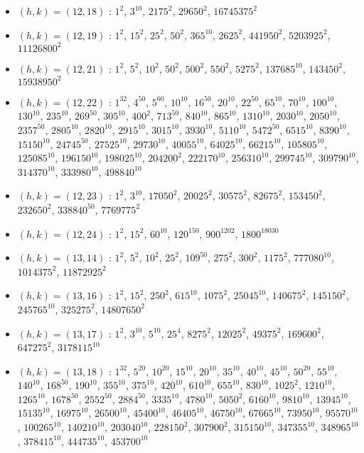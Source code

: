 \begin{itemize}
\item $(h,k)=(12,18)$ : $1^{2}$, $3^{10}$, $2175^{2}$, $29650^{2}$, $16745375^{2}$
\item $(h,k)=(12,19)$ : $1^{2}$, $15^{2}$, $25^{2}$, $50^{2}$, $365^{10}$, $2625^{2}$, $441950^{2}$, $5203925^{2}$, $11126800^{2}$
\item $(h,k)=(12,21)$ : $1^{2}$, $5^{2}$, $10^{2}$, $50^{2}$, $500^{2}$, $550^{2}$, $5275^{2}$, $137685^{10}$, $143450^{2}$, $15938950^{2}$
\item $(h,k)=(12,22)$ : $1^{32}$, $4^{50}$, $5^{60}$, $10^{10}$, $16^{50}$, $20^{10}$, $22^{50}$, $65^{10}$, $70^{10}$, $100^{10}$, $130^{10}$, $235^{10}$, $269^{50}$, $305^{10}$, $400^{2}$, $713^{50}$, $840^{10}$, $865^{10}$, $1310^{10}$, $2030^{10}$, $2050^{10}$, $2357^{50}$, $2805^{10}$, $2820^{10}$, $2915^{10}$, $3015^{10}$, $3930^{10}$, $5110^{10}$, $5472^{50}$, $6515^{10}$, $8390^{10}$, $15150^{10}$, $24745^{50}$, $27525^{10}$, $29730^{10}$, $40055^{10}$, $64025^{10}$, $66215^{10}$, $105805^{10}$, $125085^{10}$, $196150^{10}$, $198025^{10}$, $204200^{2}$, $222170^{10}$, $256310^{10}$, $299745^{10}$, $309790^{10}$, $314370^{10}$, $333980^{10}$, $498840^{10}$
\item $(h,k)=(12,23)$ : $1^{2}$, $3^{10}$, $17050^{2}$, $20025^{2}$, $30575^{2}$, $82675^{2}$, $153450^{2}$, $232650^{2}$, $338840^{50}$, $7769775^{2}$
\item $(h,k)=(12,24)$ : $1^{2}$, $15^{2}$, $60^{10}$, $120^{150}$, $900^{1202}$, $1800^{18030}$
\item $(h,k)=(13,14)$ : $1^{2}$, $5^{2}$, $10^{2}$, $25^{2}$, $109^{50}$, $275^{2}$, $300^{2}$, $1175^{2}$, $777080^{10}$, $1014375^{2}$, $11872925^{2}$
\item $(h,k)=(13,16)$ : $1^{2}$, $15^{2}$, $250^{2}$, $615^{10}$, $1075^{2}$, $25045^{10}$, $140675^{2}$, $145150^{2}$, $245765^{10}$, $325275^{2}$, $14807650^{2}$
\item $(h,k)=(13,17)$ : $1^{2}$, $3^{10}$, $5^{10}$, $25^{4}$, $8275^{2}$, $12025^{2}$, $49375^{2}$, $169600^{2}$, $647275^{2}$, $3178115^{10}$
\item $(h,k)=(13,18)$ : $1^{32}$, $5^{20}$, $10^{20}$, $15^{10}$, $20^{10}$, $35^{10}$, $40^{10}$, $45^{10}$, $50^{20}$, $55^{10}$, $140^{10}$, $168^{50}$, $190^{10}$, $355^{10}$, $375^{10}$, $420^{10}$, $610^{10}$, $655^{10}$, $830^{10}$, $1025^{2}$, $1210^{10}$, $1265^{10}$, $1678^{50}$, $2552^{50}$, $2884^{50}$, $3335^{10}$, $4780^{10}$, $5050^{2}$, $6160^{10}$, $9810^{10}$, $13945^{10}$, $15135^{10}$, $16975^{10}$, $26500^{10}$, $45400^{10}$, $46405^{10}$, $46750^{10}$, $67665^{10}$, $73950^{10}$, $95570^{10}$, $100265^{10}$, $140210^{10}$, $203040^{10}$, $228150^{2}$, $307900^{2}$, $315150^{10}$, $347355^{10}$, $348965^{10}$, $378415^{10}$, $444735^{10}$, $453700^{10}$

\end{itemize}
